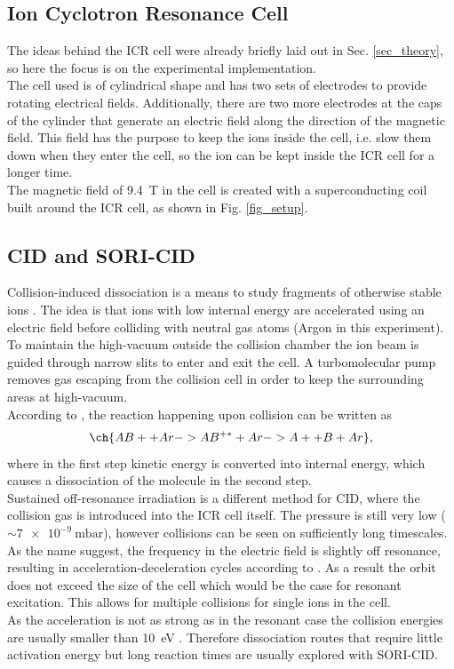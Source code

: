 \documentclass[a4paper,10pt]{article}
\begin{document}
\subsection{Ion Cyclotron Resonance Cell}
The ideas behind the ICR cell were already briefly laid out in Sec. \ref{sec_theory}, so here the focus is on the experimental implementation. \\
The cell used is of cylindrical shape and has two sets of electrodes to provide rotating electrical fields. Additionally, there are two more electrodes at the caps of the cylinder that generate an electric field along the direction of the magnetic field. This field has the purpose to keep the ions inside the cell, i.e. slow them down when they enter the cell, so the ion can be kept inside the ICR cell for a longer time. \\
The magnetic field of \SI{9.4}{\tesla} in the cell is created with a superconducting coil built around the ICR cell, as shown in Fig. \ref{fig_setup}.

\subsection{CID and SORI-CID}
Collision-induced dissociation is a means to study fragments of  otherwise stable ions \cite{ms_book}. The idea is that ions with low internal energy are accelerated using an electric field before colliding with neutral gas atoms (Argon in this experiment). To maintain the high-vacuum outside the collision chamber the ion beam is guided through narrow slits to enter and exit the cell. A turbomolecular pump removes gas escaping from the collision cell in order to keep the surrounding areas at high-vacuum. \\
According to \cite{ms_book}, the reaction happening upon collision can be written as
\begin{equation}
	\ch{AB+ + Ar -> AB^{+*} + Ar -> A+ + B + Ar},
\end{equation}
where in the first step kinetic energy is converted into internal energy, which causes a dissociation of the molecule in the second step. \\
Sustained off-resonance irradiation is a different method for CID, where the collision gas is introduced into the ICR cell itself. The pressure is still very low ($\sim \SI{7e-9}{\milli \bar}$), however collisions can be seen on sufficiently long timescales. As the name suggest, the frequency in the electric field is slightly off resonance, resulting in acceleration-deceleration cycles according to \cite{ms_book}. As a result the orbit does not exceed the size of the cell which would be the case for resonant excitation. This allows for multiple collisions for single ions in the cell. \\
As the acceleration is not as strong as in the resonant case the collision energies are usually smaller than \SI{10}{\electronvolt} \cite{ms_book}. Therefore dissociation routes that require little activation energy but long reaction times are usually explored with SORI-CID.
\end{document}

